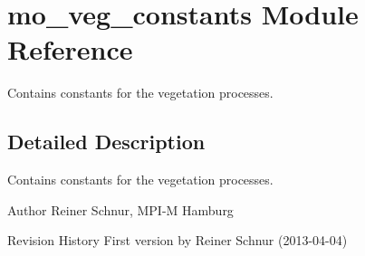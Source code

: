 \hypertarget{namespacemo__veg__constants}{}\section{mo\+\_\+veg\+\_\+constants Module Reference}
\label{namespacemo__veg__constants}


Contains constants for the vegetation processes.  




\subsection{Detailed Description}
Contains constants for the vegetation processes. 

\begin{DoxyAuthor}{Author}
Reiner Schnur, M\+P\+I-\/\+M Hamburg
\end{DoxyAuthor}
\begin{DoxyParagraph}{Revision History}
First version by Reiner Schnur (2013-\/04-\/04) 
\end{DoxyParagraph}
